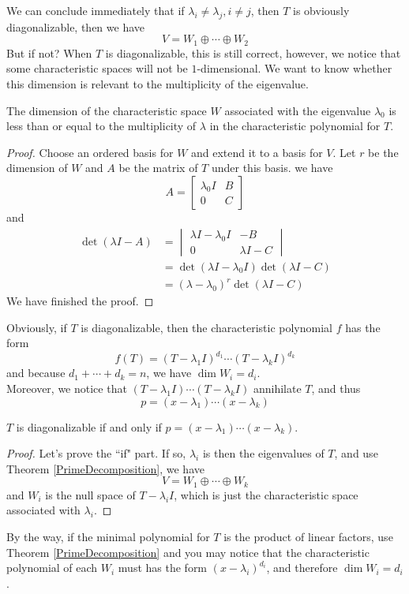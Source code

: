 \documentclass{article}
\begin{document}
We can conclude immediately that if $\lambda_i\neq\lambda_j,i\neq j$, then $T$ is obviously diagonalizable, then we have
\[V=W_1\oplus\cdots\oplus W_2\]
But if not? When $T$ is diagonalizable, this is still correct, however, we notice that some characteristic spaces will not be $1$-dimensional. We want to know whether this dimension is relevant to the multiplicity of the eigenvalue.
\begin{thm}
	The dimension of the characteristic space $W$ associated with the eigenvalue $\lambda_0$ is less than or equal to the multiplicity of $\lambda$ in the characteristic polynomial for $T$.
\end{thm}  
\begin{proof}
	Choose an ordered basis for $W$ and extend it to a basis for $V$. Let $r$ be the dimension of $W$ and $A$ be the matrix of $T$ under this basis. we have
	\[A=\begin{bmatrix}
		\lambda_0 I&B\\
		0&C
	\end{bmatrix}\]
	and
	\begin{align*}
		\det(\lambda I-A)&=\begin{vmatrix}
			\lambda I-\lambda_0I&-B\\
			0&\lambda I-C
		\end{vmatrix}\\
		&=\det(\lambda I-\lambda_0I)\det(\lambda I-C)\\
		&=(\lambda-\lambda_0)^r\det(\lambda I-C)
	\end{align*}
	We have finished the proof.
\end{proof} 
Obviously, if $T$ is diagonalizable, then the characteristic polynomial $f$ has the form
\[f(T)=(T-\lambda_1I)^{d_1}\cdots(T-\lambda_kI)^{d_k}\]
and because $d_1+\cdots+d_k=n$, we have $\dim W_i=d_i$.\\
\indent Moreover, we notice that $(T-\lambda_1I)\cdots(T-\lambda_kI)$ annihilate $T$, and thus
\[p=(x-\lambda_1)\cdots(x-\lambda_k)\] 
\begin{thm}
	$T$ is diagonalizable if and only if $p=(x-\lambda_1)\cdots(x-\lambda_k)$.
\end{thm}
\begin{proof}
	Let's prove the ``if" part. If so, $\lambda_i$ is then the eigenvalues of $T$, and use Theorem \ref{PrimeDecomposition}, we have
	\[V=W_1\oplus\cdots\oplus W_k\]
	and $W_i$ is the null space of $T-\lambda_iI$, which is just the characteristic space associated with $\lambda_i$.
\end{proof}
By the way, if the minimal polynomial for $T$ is the product of linear factors, use Theorem \ref{PrimeDecomposition} and you may notice that the characteristic polynomial of each $W_i$ must has the form $(x-\lambda_i)^{d_i}$, and therefore $\dim W_i=d_i$.\\ 
\end{document}
